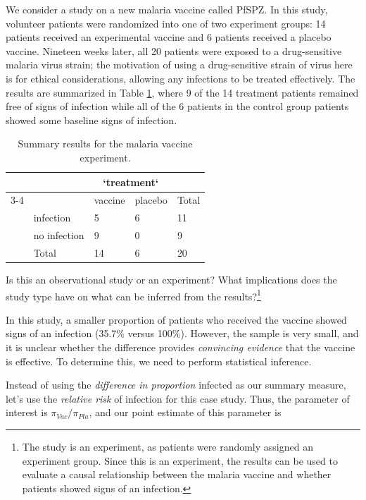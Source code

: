\documentclass[
  10pt,
  openany]{book}
\theoremstyle{definition}
\theoremstyle{definition}
\theoremstyle{definition}
\theoremstyle{definition}
\theoremstyle{remark}
\begin{document}
We consider a study on a new malaria vaccine called PfSPZ. In this study, volunteer patients were randomized into one of two experiment groups: 14 patients received an experimental vaccine and 6 patients received a placebo vaccine. Nineteen weeks later, all 20 patients were exposed to a drug-sensitive malaria virus strain; the motivation of using a drug-sensitive strain of virus here is for ethical considerations, allowing any infections to be treated effectively. The results are summarized in Table \ref{tab:malaria-vaccine-20-exp-summary}, where 9 of the 14 treatment patients remained free of signs of infection while all of the 6 patients in the control group patients showed some baseline signs of infection.

\begin{table}
\centering
\caption{\label{tab:malaria-vaccine-20-exp-summary}Summary results for the malaria vaccine experiment.}
\centering
\begin{tabular}[t]{l|l|l|l|l}
\hline
\multicolumn{1}{c|}{ } & \multicolumn{1}{c|}{ } & \multicolumn{2}{c|}{`treatment`} & \multicolumn{1}{c}{ } \\
\cline{3-4}
 &  & vaccine & placebo & Total\\
\hline
 & infection & 5 & 6 & 11\\
\hline
 & no infection & 9 & 0 & 9\\
\hline
 & Total & 14 & 6 & 20\\
\hline
\end{tabular}
\end{table}

Is this an observational study or an experiment? What implications does the study type have on what can be inferred from the results?\footnote{The study is an experiment, as patients were randomly assigned an experiment group. Since this is an experiment, the results can be used to evaluate a causal relationship between the malaria vaccine and whether patients showed signs of an infection.}

In this study, a smaller proportion of patients who received the vaccine showed signs of an infection (35.7\% versus 100\%). However, the sample is very small, and it is unclear whether the difference provides \emph{convincing evidence} that the vaccine is effective. To determine this, we need to perform statistical inference.

Instead of using the \emph{difference in proportion} infected as our summary measure, let's use the \emph{relative risk} of infection for this case study. Thus, the parameter of interest is \(\pi_{Vac} / \pi_{Pla}\), and our point estimate of this parameter is
\end{document}
